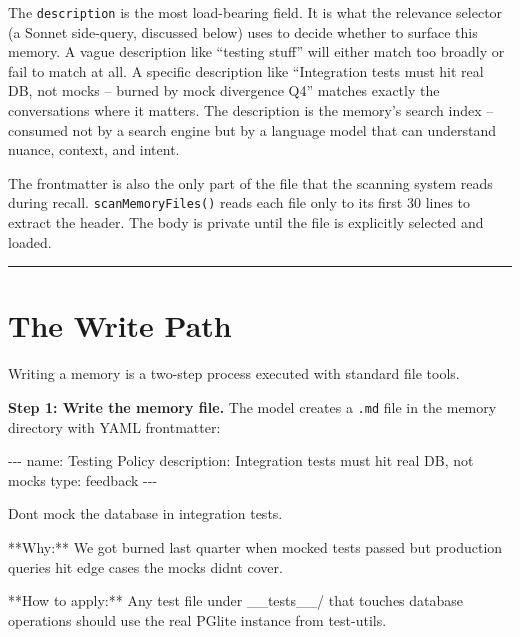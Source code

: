 \documentclass[
  english,
  11pt,
  letterpaper,
]{book}
\newenvironment{Shaded}{\begin{snugshade}}{\end{snugshade}}
\newcommand{\AnnotationTok}[1]{\textcolor[rgb]{0.37,0.37,0.37}{#1}}
\newcommand{\CommentTok}[1]{\textcolor[rgb]{0.37,0.37,0.37}{#1}}
\newcommand{\InformationTok}[1]{\textcolor[rgb]{0.37,0.37,0.37}{#1}}
\newcommand{\NormalTok}[1]{\textcolor[rgb]{0.00,0.23,0.31}{#1}}
\begin{document}
The \texttt{description} is the most load-bearing field. It is what the
relevance selector (a Sonnet side-query, discussed below) uses to decide
whether to surface this memory. A vague description like ``testing
stuff'' will either match too broadly or fail to match at all. A
specific description like ``Integration tests must hit real DB, not
mocks -- burned by mock divergence Q4'' matches exactly the
conversations where it matters. The description is the memory's search
index -- consumed not by a search engine but by a language model that
can understand nuance, context, and intent.

The frontmatter is also the only part of the file that the scanning
system reads during recall. \texttt{scanMemoryFiles()} reads each file
only to its first 30 lines to extract the header. The body is private
until the file is explicitly selected and loaded.

\begin{center}\rule{0.5\linewidth}{0.5pt}\end{center}

\section{The Write Path}\label{the-write-path}

Writing a memory is a two-step process executed with standard file
tools.

\textbf{Step 1: Write the memory file.} The model creates a \texttt{.md}
file in the memory directory with YAML frontmatter:

\begin{Shaded}
\begin{Highlighting}[]
\CommentTok{{-}{-}{-}}
\AnnotationTok{name:}\CommentTok{ Testing Policy}
\AnnotationTok{description:}\CommentTok{ Integration tests must hit real DB, not mocks}
\AnnotationTok{type:}\CommentTok{ feedback}
\CommentTok{{-}{-}{-}}

\NormalTok{Don\textquotesingle{}t mock the database in integration tests.}

\NormalTok{**Why:** We got burned last quarter when mocked tests passed but production}
\NormalTok{queries hit edge cases the mocks didn\textquotesingle{}t cover.}

\NormalTok{**How to apply:** Any test file under }\InformationTok{\textasciigrave{}\_\_tests\_\_/\textasciigrave{}}\NormalTok{ that touches database}
\NormalTok{operations should use the real PGlite instance from test{-}utils.}
\end{Highlighting}
\end{Shaded}
\end{document}
